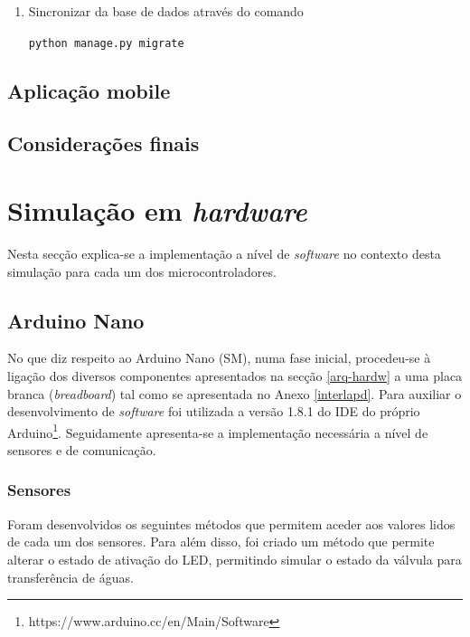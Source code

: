 \begin{enumerate}
	
	\item Sincronizar da base de dados através do comando 
	
	\texttt{python manage.py migrate}
	
	 
	 
	 
\end{enumerate}




\subsection{Aplicação mobile}




\subsection{Considerações finais}





\newpage
\section{Simulação em \textit{hardware}}

Nesta secção explica-se a implementação a nível de \textit{software} no contexto desta simulação para cada um dos microcontroladores. 


\subsection{Arduino Nano}
\label{arduinonanoard}

No que diz respeito ao Arduino Nano (\acl{SM}), numa fase inicial,  procedeu-se à ligação dos diversos componentes  apresentados na secção \ref{arq-hardw} a uma placa branca (\textit{breadboard}) tal como se apresentada no Anexo \ref{interlapd}. Para auxiliar o desenvolvimento de \textit{software} foi utilizada a versão 1.8.1 do \ac{IDE} do próprio Arduino\footnote{https://www.arduino.cc/en/Main/Software}. Seguidamente apresenta-se a implementação necessária a nível de sensores e de comunicação. 

\subsubsection{Sensores}


Foram desenvolvidos os seguintes métodos que permitem aceder aos valores lidos de cada um dos sensores. Para além disso, foi criado um método que permite alterar o estado de ativação do \ac{LED}, permitindo simular o estado da válvula para transferência de águas. 

